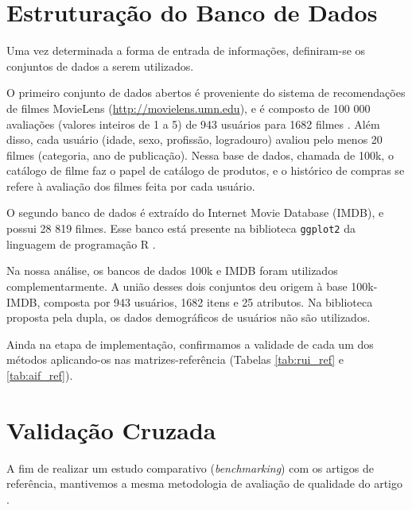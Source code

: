 \section{Estruturação do Banco de Dados} %
\label{sec:modelamento_e_simula_o}



Uma vez determinada a forma de entrada de informações, definiram-se os conjuntos de dados a serem utilizados. 

O primeiro conjunto de dados abertos é proveniente do sistema de recomendações de filmes MovieLens (\url{http://movielens.umn.edu}), e é composto de 100 000 avaliações (valores inteiros de 1 a 5) de 943 usuários para 1682 filmes \cite{movielensdataset}. Além disso, cada usuário (idade, sexo, profissão, logradouro) avaliou pelo menos 20 filmes (categoria, ano de publicação). Nessa base de dados, chamada de 100k, o catálogo de filme faz o papel de catálogo de produtos, e o histórico de compras se refere à avaliação dos filmes feita por cada usuário. 

O segundo banco de dados é extraído do Internet Movie Database (IMDB), e possui 28 819 filmes. Esse banco está presente na biblioteca \texttt{ggplot2} da linguagem de programação R \cite{moviesggplot2dataset}.

Na nossa análise, os bancos de dados 100k e IMDB foram utilizados complementarmente. A união desses dois conjuntos deu origem à base 100k-IMDB, composta por 943 usuários, 1682 itens e 25 atributos. Na biblioteca proposta pela dupla, os dados demográficos de usuários não são utilizados. 


Ainda na etapa de implementação, confirmamos a validade de cada um dos métodos aplicando-os nas matrizes-referência (Tabelas \ref{tab:rui_ref} e \ref{tab:aif_ref}). 

\section{Validação Cruzada} %
\label{sec:prot_tipos_testes}

A fim de realizar um estudo comparativo (\textit{benchmarking}) com os artigos de referência, mantivemos a mesma metodologia de avaliação de qualidade do artigo .

